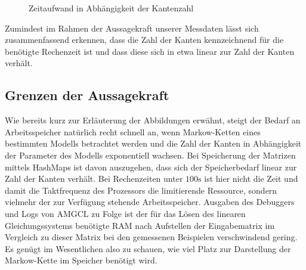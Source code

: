 \documentclass[a4paper]{article}
\newcommand{\mc}{Markow-Kette}
\theoremstyle{nonumberplain}
\begin{document}
\begin{figure}
	\caption{Zeitaufwand in Abhängigkeit der Kantenzahl}
	\label{eigen}
	\centering
\end{figure}

Zumindest im Rahmen der Aussagekraft unserer Messdaten lässt sich zusammenfassend erkennen, dass die Zahl der Kanten kennzeichnend für die benötigte Rechenzeit ist und dass diese sich in etwa linear zur Zahl der Kanten verhält.

\subsection{Grenzen der Aussagekraft}

Wie bereits kurz zur Erläuterung der Abbildungen erwähnt, steigt der Bedarf an Arbeitsspeicher natürlich recht schnell an, wenn \mc{}n eines bestimmten Modells betrachtet werden und die Zahl der Kanten in Abhängigkeit der Parameter des Modells exponentiell wachsen. Bei Speicherung der Matrizen mittels HashMaps ist davon auszugehen, dass sich der Speicherbedarf linear zur Zahl der Kanten verhält.
Bei Rechenzeiten unter $100\mathrm{s}$ ist hier nicht die Zeit und damit die Taktfrequenz des Prozessors die limitierende Ressource, sondern vielmehr der zur Verfügung stehende Arbeitsspeicher. Ausgaben des Debuggers und Logs von AMGCL zu Folge ist der für das Lösen des linearen Gleichungssystems benötigte RAM nach Aufstellen der Eingabematrix im Vergleich zu dieser Matrix bei den gemessenen Beispielen verschwindend gering. Es genügt im Wesentlichen also zu schauen, wie viel Platz zur Darstellung der \mc{} im Speicher benötigt wird.
\end{document}
